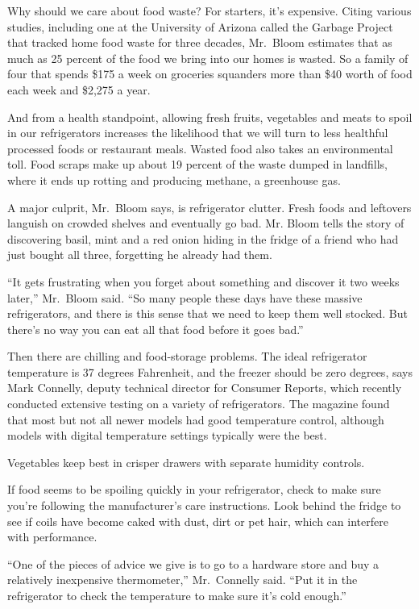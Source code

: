 ﻿\documentclass[12pt]{article}
\begin{document}
Why should we care about food waste? For starters, it's expensive. Citing various studies, including
one at the University of Arizona called the Garbage Project that tracked home food waste for three
decades, Mr.~Bloom estimates that as much as 25 percent of the food we bring into our homes is
wasted. So a family of four that spends \$175 a week on groceries squanders more than \$40 worth of
food each week and \$2,275 a year.

And from a health standpoint, allowing fresh fruits, vegetables and meats to spoil in our
refrigerators increases the likelihood that we will turn to less healthful processed foods or
restaurant meals. Wasted food also takes an environmental toll. Food scraps make up about 19 percent
of the waste dumped in landfills, where it ends up rotting and producing methane, a greenhouse gas.

A major culprit, Mr.~Bloom says, is refrigerator clutter. Fresh foods and leftovers languish on
crowded shelves and eventually go bad. Mr. Bloom tells the story of discovering basil, mint and a
red onion hiding in the fridge of a friend who had just bought all three, forgetting he already had
them.

``It gets frustrating when you forget about something and discover it two weeks later,'' Mr.~Bloom
said. ``So many people these days have these massive refrigerators, and there is this sense that we
need to keep them well stocked. But there's no way you can eat all that food before it goes bad.''

Then there are chilling and food-storage problems. The ideal refrigerator temperature is 37 degrees
Fahrenheit, and the freezer should be zero degrees, says Mark Connelly, deputy technical director
for Consumer Reports, which recently conducted extensive testing on a variety of refrigerators. The
magazine found that most but not all newer models had good temperature control, although models with
digital temperature settings typically were the best.

Vegetables keep best in crisper drawers with separate humidity controls.

If food seems to be spoiling quickly in your refrigerator, check to make sure you're following the
manufacturer's care instructions. Look behind the fridge to see if coils have become caked with
dust, dirt or pet hair, which can interfere with performance.

``One of the pieces of advice we give is to go to a hardware store and buy a relatively inexpensive
thermometer,'' Mr.~Connelly said. ``Put it in the refrigerator to check the temperature to make sure
it's cold enough.''
\end{document}
